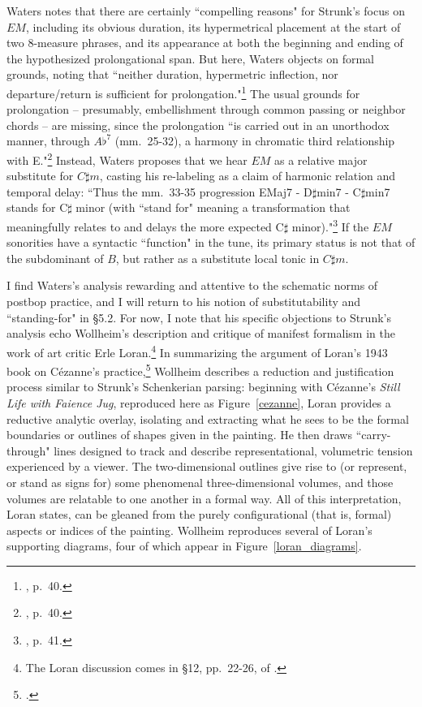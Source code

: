 Waters notes that there are certainly ``compelling reasons" for Strunk's focus on $EM$, including its obvious duration, its hypermetrical placement at the start of two 8-measure phrases, and its appearance at both the beginning and ending of the hypothesized prolongational span.  But here, Waters objects on formal grounds, noting that ``neither duration, hypermetric inflection, nor departure/return is sufficient for prolongation."\footnote{\cite{waters2016}, p.\ 40.}  The usual grounds for prolongation -- presumably, embellishment through common passing or neighbor chords -- are missing, since the prolongation ``is carried out in an unorthodox manner, through $A\flat^7$ (mm.\ 25-32), a harmony in chromatic third relationship with E."\footnote{\cite{waters2016}, p.\ 40.}  Instead, Waters proposes that we hear $EM$ as a relative major substitute for $C\sharp m$, casting his re-labeling as a claim of harmonic relation and temporal delay: ``Thus the mm.\ 33-35 progression EMaj7 - D$\sharp$min7 - C$\sharp$min7 stands for C$\sharp$ minor (with ``stand for" meaning a transformation that meaningfully relates to and delays the more expected C$\sharp$ minor)."\footnote{\cite{waters2016}, p.\ 41.}  If the $EM$ sonorities have a syntactic ``function" in the tune, its primary status is not that of the subdominant of $B$, but rather as a substitute local tonic in $C\sharp m$.

I find Waters's analysis rewarding and attentive to the schematic norms of postbop practice, and I will return to his notion of substitutability and ``standing-for" in \S 5.2.  For now, I note that his specific objections to Strunk's analysis echo Wollheim's description and critique of manifest formalism in the work of art critic Erle Loran.\footnote{The Loran discussion comes in \S 12, pp.\ 22-26, of \cite{wollheim1995}.}  In summarizing the argument of Loran's 1943 book on C\'{e}zanne's practice,\footnote{\cite{loran1943}.} Wollheim describes a reduction and justification process similar to Strunk's Schenkerian parsing: beginning with C\'{e}zanne's \emph{Still Life with Faience Jug}, reproduced here as Figure~\ref{cezanne}, Loran provides a reductive analytic overlay, isolating and extracting what he sees to be the formal boundaries or outlines of shapes given in the painting.  He then draws ``carry-through" lines designed to track and describe representational, volumetric tension experienced by a viewer.  The two-dimensional outlines give rise to (or represent, or stand as signs for) some phenomenal three-dimensional volumes, and those volumes are relatable to one another in a formal way.  All of this interpretation, Loran states, can be gleaned from the purely configurational (that is, formal) aspects or indices of the painting.  Wollheim reproduces several of Loran's supporting diagrams, four of which appear in Figure~\ref{loran_diagrams}.

